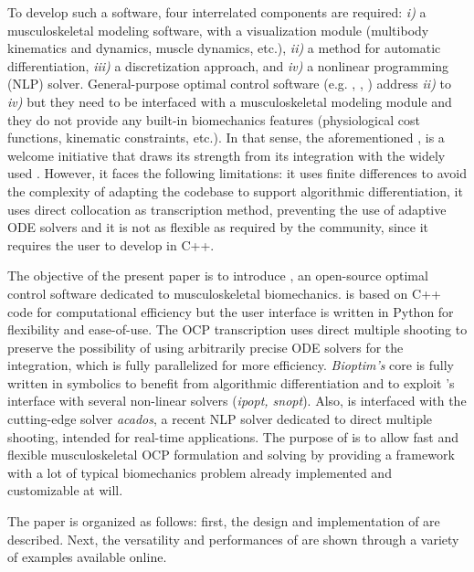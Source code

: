 To develop such a software, four interrelated components are required: \textit{i)} a musculoskeletal modeling software, with a visualization module (multibody kinematics and dynamics, muscle dynamics, etc.), \textit{ii)} a method for automatic differentiation, \textit{iii)} a discretization approach, and \textit{iv)} a nonlinear programming (NLP) solver. 
General-purpose optimal control software (e.g. \gpopsii [\addref], \muscodii [\addref], \acado [\addref]) address \textit{ii)} to \textit{iv)} but they need to be interfaced with a musculoskeletal modeling module and they do not provide any built-in biomechanics features (physiological cost functions, kinematic constraints, etc.). 
In that sense, the aforementioned \moco, is a welcome initiative that draws its strength from its integration with the widely used \opensim.
However, it faces the following limitations: it uses finite differences to avoid the complexity of adapting the \opensim codebase to support algorithmic differentiation, it uses direct collocation as transcription method, preventing the use of adaptive ODE solvers and it is not as flexible as required by the community, since it requires the user to develop in C++. 

The objective of the present paper is to introduce \bioptim, an open-source optimal control software dedicated to musculoskeletal biomechanics.
\bioptim is based on C++ code for computational efficiency but the user interface is written in Python for flexibility and ease-of-use. 
The OCP transcription uses direct multiple shooting to preserve the possibility of using arbitrarily precise ODE solvers for the integration, which is fully parallelized for more efficiency.
\textit{Bioptim's} core is fully written in \casadi symbolics to benefit from algorithmic differentiation and to exploit \casadi 's interface with several non-linear solvers (\textit{ipopt, snopt}).
Also, \bioptim is interfaced with the cutting-edge solver \textit{acados}, a recent NLP solver dedicated to direct multiple shooting, intended for real-time applications.
The purpose of \bioptim is to allow fast and flexible musculoskeletal OCP formulation and solving by providing a framework with a lot of typical biomechanics problem already implemented and customizable at will.

The paper is organized as follows: first, the design and implementation of \bioptim are described.
Next, the versatility and performances of \bioptim are shown through a variety of examples available online. 
